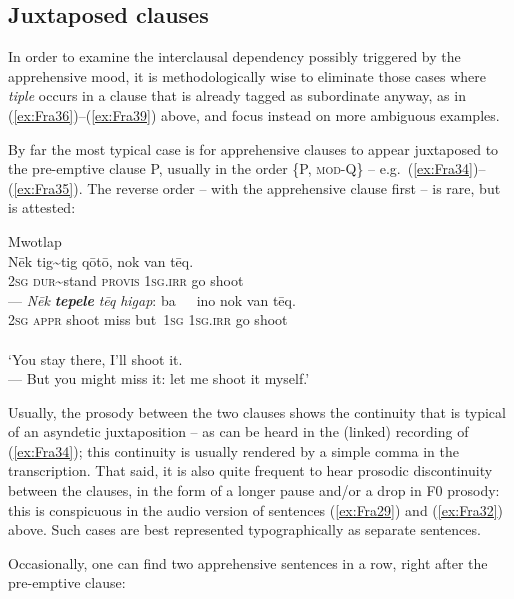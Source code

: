 \documentclass[output=paper,colorlinks,citecolor=brown]{langscibook}
\begin{document}
\subsection{Juxtaposed clauses} 
\label{subsec:juxtaposed}

In order to examine the interclausal dependency possibly triggered by the apprehensive mood, it is methodologically wise to eliminate those cases where \textit{tiple} occurs in a clause that is already tagged as subordinate anyway, as in (\ref{ex:Fra36})--(\ref{ex:Fra39}) above, and focus instead on more ambiguous examples.

By far the most typical case is for apprehensive clauses to appear juxtaposed to the pre-emptive clause P, usually in the order \{P, \textsc{mod-Q}\} -- e.g.\ (\ref{ex:Fra34})--(\ref{ex:Fra35}). The reverse order -- with the apprehensive clause first -- is rare, but is attested:
 
\ea \label{ex:Fra41} \textnormal{Mwotlap}  \\
\gll Nēk tig\textasciitilde tig qōtō, nok van tēq. \\
\textsc{2sg} \textsc{dur}\textasciitilde stand \textsc{provis} \textsc{1sg.irr} go shoot \\
\gll --- \textit{Nēk} \textbf{\textit{tepele}} \textit{tēq} \textit{higap}: ba~~~ino nok van tēq. \\
 {} \textsc{2sg} \textsc{appr} shoot miss but~\textsc{1sg} \textsc{1sg.irr} go shoot \\
 \\
`You stay there, I'll shoot it.\\
--- But you might miss it: let me shoot it myself.' 
\z

 
Usually, the prosody between the two clauses shows the continuity that is typical of an asyndetic juxtaposition -- as can be heard in the (linked) recording of (\ref{ex:Fra34}); this continuity is usually rendered by a simple comma in the transcription. That said, it is also quite frequent to hear prosodic discontinuity between the clauses, in the form of a longer pause and/or a drop in F0 prosody: this is conspicuous in the audio version of sentences (\ref{ex:Fra29}) and (\ref{ex:Fra32}) above. Such cases are best represented typographically as separate sentences.

Occasionally, one can find two apprehensive sentences in a row, right after the pre-emptive clause:
\end{document}
